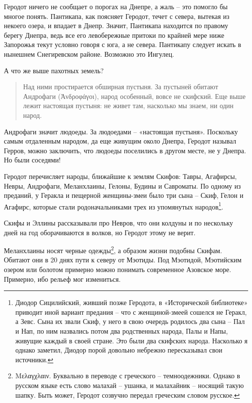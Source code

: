 Геродот ничего не сообщает о порогах на Днепре, а жаль – это помогло бы многое понять. Пантикапа, как поясняет Геродот, течет с севера, вытекая из некоего озера, и впадает в Днепр. Значит, Пантикапа находится по правому берегу Днепра, ведь все его левобережные притоки по крайней мере ниже Запорожья текут условно говоря с юга, а не севера. Пантикапу следует искать в нынешнем Снегиревском районе. Возможно это Ингулец.

А что же выше пахотных земель?

\begin{quotation}
Над ними простирается обширная пустыня. За пустыней обитают Андрофаги (Ἀνδροφάγοι), народ особенный, вовсе не скифский. Еще выше лежит настоящая пустыня: не живет там, насколько мы знаем, ни один народ.
\end{quotation}

Андрофаги значит людоеды. За людоедами – «настоящая пустыня». Поскольку самым отдаленным народом, да еще живущим около Днепра, Геродот называл Герров, можно заключить, что людоеды поселились в другом месте, не у Днепра. Но были соседями! 

Геродот перечисляет народы, ближайшие к землям Скифов: Тавры, Агафирсы, Невры, Андрофаги, Меланхлаины, Гелоны, Будины и Савроматы. По одному из преданий, у Геракла и пещерной женщины-змеи было три сына – Скиф, Гелон и Агафирс, которые стали родоначальниками трех из упомянутых народов\footnote{Диодор Сицилийский, живший позже Геродота, в «Исторической библиотеке» приводит иной вариант предания – что с женщиной-змеей сошелся не Геракл, а Зевс. Сына их звали Скиф, у него в свою очередь родилось два сына – Пал и Нап, по ним назвались потом два родственных народа, Палы и Напы, живущие каждый в своей стране. Это были два скифских народа. Насколько я однако заметил, Диодор порой довольно небрежно пересказывал свои источники.}.

Скифы и Эллины рассказывали про Невров, что они колдуны и по нескольку дней на год оборачиваются в волков, но Геродот этому не верит.

Меланхлаины носят черные одежды\footnote{Μελαγχλαιν. Буквально в переводе с греческого – темноодежники. Однако в русском языке есть слово малахай – ушанка, и малахайник – носящий такую шапку. Быть может, Геродот созвучно передал греческим словом русское.}, а образом жизни подобны Скифам. Обитают они в 20 днях пути к северу от Мэотиды. Под Мэотидой, Мэотийским озером или болотом примерно можно понимать современное Азовское море. Примерно, ибо рельеф мог измениться.

